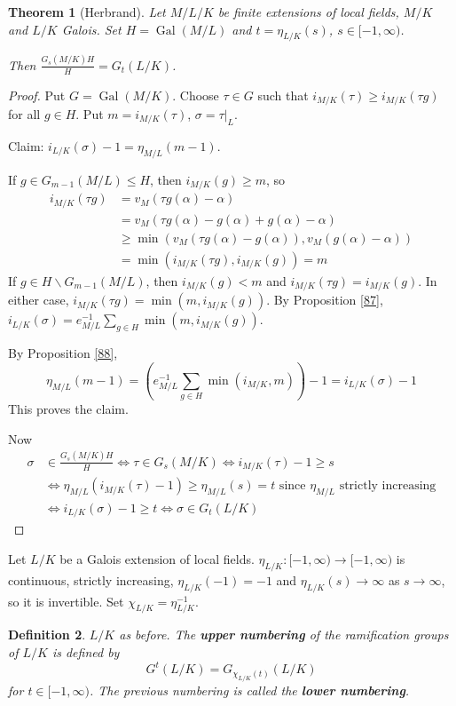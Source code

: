 \documentclass[a4paper]{article}
\newtheorem{definition}{Definition}
\newtheorem{theorem}[definition]{Theorem}
\DeclareMathOperator{\Gal}{Gal}
\begin{document}
\begin{theorem}[Herbrand]
	Let $M/L/K$ be finite extensions of local fields,
	$M/K$ and $L/K$ Galois.
	Set $H=\Gal(M/L)$ and $t = \eta_{L/K}(s)$, $s \in [-1, \infty)$.
	
	Then $\frac{G_s(M/K)H}{H} = G_t(L/K)$.
\end{theorem}
\begin{proof}
	Put $G=\Gal(M/K)$.
	Choose $\tau \in G$ such that $i_{M/K}(\tau) \geq i_{M/K}(\tau g)$ for all $g \in H$.
	Put $m = i_{M/K}(\tau)$, $\sigma = \tau|_L$.
	
	Claim: $i_{L/K}(\sigma) - 1 = \eta_{M/L}(m-1)$.
	
	If $g \in G_{m-1}(M/L) \leq H$, then $i_{M/K}(g) \geq m$, so
	\begin{align*}
		i_{M/K}(\tau g) &= v_M(\tau g(\alpha) - \alpha) \\
		&= v_M(\tau g(\alpha) - g(\alpha) + g(\alpha) - \alpha) \\
		&\geq \min (v_M(\tau g(\alpha) - g(\alpha)), v_M(g(\alpha) - \alpha)) \\
		&= \min(i_{M/K}(\tau g), i_{M/K}(g)) = m
	\end{align*}
	If $g \in H \backslash G_{m-1}(M/L)$,
	then $i_{M/K}(g) < m$ and $i_{M/K}(\tau g) = i_{M/K}(g)$.
	In either case, $i_{M/K}(\tau g) = \min(m, i_{M/K}(g))$.
	By Proposition \ref{87}, $i_{L/K}(\sigma) = e_{M/L}^{-1} \sum_{g \in H}\min(m, i_{M/K}(g))$.
	
	By Proposition \ref{88},
	$$\eta_{M/L}(m-1) = \left(e_{M/L}^{-1} \sum_{g \in H} \min(i_{M/K}, m)\right) - 1 = i_{L/K}(\sigma) - 1$$
	This proves the claim.
	
	Now
	\begin{align*}
		\sigma &\in \frac{G_s(M/K)H}{H} \iff \tau \in G_s(M/K) \iff i_{M/K}(\tau) - 1 \geq s \\
		&\iff \eta_{M/L}(i_{M/K}(\tau) - 1) \geq \eta_{M/L}(s) = t \text{ since $\eta_{M/L}$ strictly increasing} \\
		&\iff i_{L/K}(\sigma) - 1 \geq t \iff \sigma \in G_t(L/K)
	\end{align*}
\end{proof}

Let $L/K$ be a Galois extension of local fields.
$\eta_{L/K}: [-1, \infty) \to [-1, \infty)$ is continuous, strictly increasing,
$\eta_{L/K}(-1) = -1$ and $\eta_{L/K}(s) \to \infty$ as $s \to \infty$,
so it is invertible.
Set $\chi_{L/K} = \eta_{L/K}^{-1}$.

\begin{definition}
	$L/K$ as before.
	The \textbf{upper numbering} of the ramification groups of $L/K$ is defined by
	$$G^t(L/K) = G_{\chi_{L/K}(t)}(L/K)$$
	for $t \in [-1, \infty)$.
	The previous numbering is called the \textbf{lower numbering}.
\end{definition}
\end{document}
